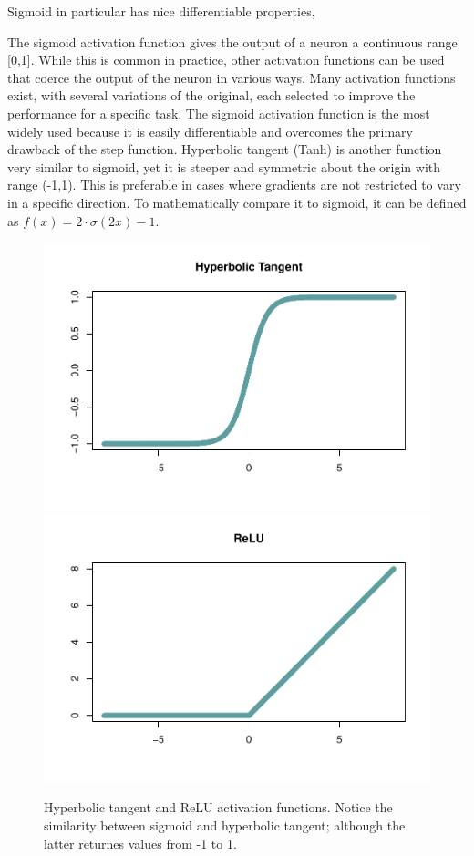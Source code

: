 Sigmoid in particular has nice differentiable properties, 

The sigmoid activation function gives the output of a neuron a continuous range [0,1].  While this is common in practice, other activation functions can be used that coerce the output of the neuron in various ways.
Many activation functions exist, with several variations of the original, each selected to improve the performance for a specific task.  The sigmoid activation function is the most widely used because it is easily differentiable and overcomes the primary drawback of the step function.  Hyperbolic tangent (Tanh) is another function very similar to sigmoid, yet it is steeper and symmetric about the origin with range (-1,1).  This is preferable in cases where gradients are not restricted to vary in a specific direction.  To mathematically compare it to sigmoid, it can be defined as $f(x) = 2 \cdot  \sigma(2x) - 1$.



\begin{figure}[H]
    \vspace{-10pt}
    \includegraphics[width=0.5\linewidth]{Figures/other-activation-functions-1.pdf}
    \includegraphics[width=0.5\linewidth]{Figures/other-activation-functions-2.pdf}
    \vspace{-40pt}
    \caption{\footnotesize Hyperbolic tangent and ReLU activation functions.  Notice the similarity between sigmoid and hyperbolic tangent; although the latter returnes values from -1 to 1.}
\end{figure}

